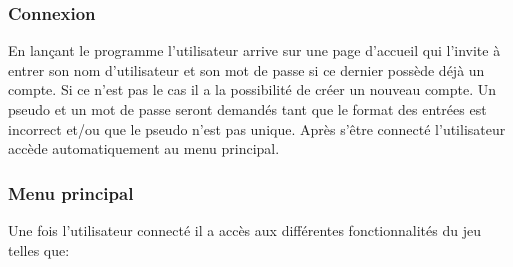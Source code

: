\documentclass[utf8]{article}
\begin{document}
\subsubsection{Connexion}
En lançant le programme l'utilisateur arrive sur une page d’accueil qui l'invite à entrer son nom d'utilisateur et son mot de passe si ce dernier possède déjà un compte. 
Si ce n'est pas le cas il a la possibilité de créer un nouveau compte. 
Un pseudo et un mot de passe seront demandés tant que le format des entrées est incorrect et/ou que le pseudo n'est pas unique.
Après s’être connecté l'utilisateur accède automatiquement au menu principal.



\subsubsection{Menu principal}
Une fois l'utilisateur connecté il a accès aux différentes fonctionnalités du jeu telles que:
\end{document}
